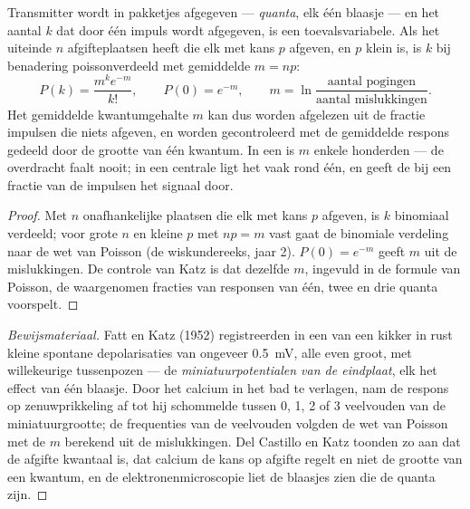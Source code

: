 \begin{theorem}\label{thm:b2:neurons-synapses:quantal}
Transmitter wordt in pakketjes afgegeven --- \emph{quanta}, elk één
blaasje --- en het aantal $k$ dat door één impuls wordt afgegeven, is een
toevalsvariabele. Als het uiteinde $n$ afgifteplaatsen heeft die elk met
kans $p$ afgeven, en $p$ klein is, is $k$ bij benadering poissonverdeeld
met gemiddelde $m = np$:
\[
P(k) = \frac{m^{k}e^{-m}}{k!}, \qquad P(0) = e^{-m}, \qquad
m = \ln\frac{\text{aantal pogingen}}{\text{aantal mislukkingen}}.
\]
Het gemiddelde kwantumgehalte $m$ kan dus worden afgelezen uit de fractie
impulsen die niets afgeven, en worden gecontroleerd met de gemiddelde
respons gedeeld door de grootte van één kwantum. In een  is $m$ enkele honderden --- de overdracht faalt nooit; in een
centrale  ligt het vaak rond één, en geeft de  bij een fractie
van de impulsen het signaal door.
\end{theorem}
\begin{proof}
Met $n$ onafhankelijke plaatsen die elk met kans $p$ afgeven, is $k$
binomiaal verdeeld; voor grote $n$ en kleine $p$ met $np = m$ vast gaat de
binomiale verdeling naar de wet van Poisson (de wiskundereeks, jaar 2).
$P(0) = e^{-m}$ geeft $m$ uit de mislukkingen. De controle van Katz is dat
dezelfde $m$, ingevuld in de formule van Poisson, de waargenomen fracties van
responsen van één, twee en drie quanta voorspelt.
\end{proof}
\begin{proof}[Bewijsmateriaal]
Fatt en Katz (1952) registreerden in een  van een kikker in rust
kleine spontane depolarisaties van ongeveer \qty{0.5}{mV}, alle even groot,
met willekeurige tussenpozen --- de \emph{miniatuurpotentialen van de
eindplaat}, elk het effect van één blaasje. Door het calcium in het bad te
verlagen, nam de respons op zenuwprikkeling af tot hij schommelde tussen 0,
1, 2 of 3 veelvouden van de miniatuurgrootte; de frequenties van de
veelvouden volgden de wet van Poisson met de
$m$ berekend uit de mislukkingen. Del Castillo en Katz toonden zo aan dat de
afgifte kwantaal is, dat calcium de kans op afgifte regelt en niet de grootte
van een kwantum, en de elektronenmicroscopie liet de blaasjes zien die de
quanta zijn.
\end{proof}


